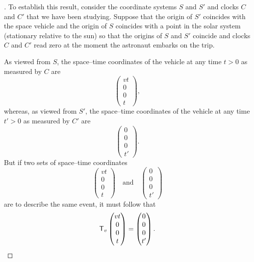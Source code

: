 \begin{proof}[]
  To establish this result, consider the coordinate systems \(S\) and \(S'\) and clocks \(C\) and \(C'\) that we have been studying.
  Suppose that the origin of \(S'\) coincides with the space vehicle and the origin of \(S\) coincides with a point in the solar system (stationary relative to the sun) so that the origins of \(S\) and \(S'\) coincide and clocks \(C\) and \(C'\) read zero at the moment the astronaut embarks on the trip.

  As viewed from \(S\), the space--time coordinates of the vehicle at any time \(t > 0\) as measured by \(C\) are
  \[
    \begin{pmatrix}
      vt \\
      0  \\
      0  \\
      t
    \end{pmatrix},
  \]
  whereas, as viewed from \(S'\), the space--time coordinates of the vehicle at any time \(t' > 0\) as measured by \(C'\) are
  \[
    \begin{pmatrix}
      0 \\
      0 \\
      0 \\
      t'
    \end{pmatrix}.
  \]
  But if two sets of space--time coordinates
  \[
    \begin{pmatrix}
      vt \\
      0  \\
      0  \\
      t
    \end{pmatrix} \quad \text{and} \quad \begin{pmatrix}
      0 \\
      0 \\
      0 \\
      t'
    \end{pmatrix}
  \]
  are to describe the same event, it must follow that
  \[
    \mathsf{T}_v\begin{pmatrix}
      vt \\
      0  \\
      0  \\
      t
    \end{pmatrix} = \begin{pmatrix}
      0 \\
      0 \\
      0 \\
      t'
    \end{pmatrix}.
\]
\end{proof}
